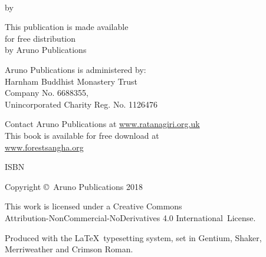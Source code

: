 \cleartoverso
\thispagestyle{empty}

{\copyrightsize
\raggedright
\setlength{\parindent}{0pt}%
\setlength{\parskip}{0.8\baselineskip}%

\thetitle\\
by \theauthor

This publication is made available\\
for free distribution\\
by Aruno Publications

Aruno Publications is administered by:\\
Harnham Buddhist Monastery Trust\\
Company No. 6688355,\\
Unincorporated Charity Reg. No. 1126476

Contact Aruno Publications at \href{https://ratanagiri.org.uk/}{www.ratanagiri.org.uk}\\
This book is available for free download at\\
\href{https://forestsangha.org/}{www.forestsangha.org}

ISBN \theISBN

Copyright \copyright\ Aruno Publications 2018

\vfill

{\footnotesize

This work is licensed under a Creative Commons\\
Attribution-NonCommercial-NoDerivatives 4.0 International~License.

Produced with the \LaTeX\ typesetting system, set in Gentium, Shaker,\\
Merriweather and Crimson Roman.

\theEditionInfo

}}
